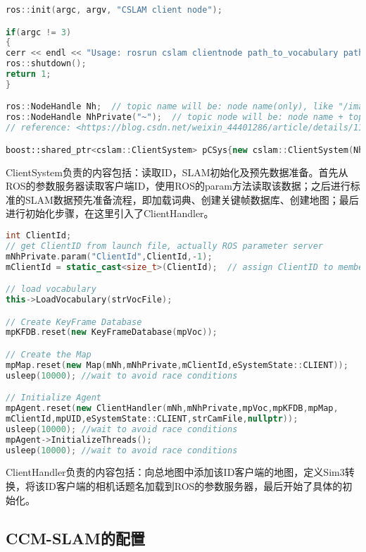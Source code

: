 \begin{lstlisting}[language={C++}]
ros::init(argc, argv, "CSLAM client node");

if(argc != 3)
{
cerr << endl << "Usage: rosrun cslam clientnode path_to_vocabulary path_to_cam_params" << endl;
ros::shutdown();
return 1;
}

ros::NodeHandle Nh;  // topic name will be: node name(only), like "/image_raw"
ros::NodeHandle NhPrivate("~");  // topic node will be: node name + topic name, like "iris_0/image_raw"
// reference: <https://blog.csdn.net/weixin_44401286/article/details/112204903>

boost::shared_ptr<cslam::ClientSystem> pCSys{new cslam::ClientSystem(Nh,NhPrivate,argv[1],argv[2])};
\end{lstlisting}

ClientSystem负责的内容包括：读取ID，SLAM初始化及预先数据准备。首先从ROS的参数服务器读取客户端ID，使用ROS的param方法读取该数据；之后进行标准的SLAM数据预先准备流程，即加载词典、创建关键帧数据库、创建地图；最后进行初始化步骤，在这里引入了ClientHandler。

\begin{lstlisting}[language={C++}]
int ClientId;
// get ClientID from launch file, actually ROS parameter server
mNhPrivate.param("ClientId",ClientId,-1);
mClientId = static_cast<size_t>(ClientId);  // assign ClientID to member of class ClientSystem, mClientID

// load vocabulary
this->LoadVocabulary(strVocFile);

// Create KeyFrame Database
mpKFDB.reset(new KeyFrameDatabase(mpVoc));

// Create the Map
mpMap.reset(new Map(mNh,mNhPrivate,mClientId,eSystemState::CLIENT));
usleep(10000); //wait to avoid race conditions

// Initialize Agent
mpAgent.reset(new ClientHandler(mNh,mNhPrivate,mpVoc,mpKFDB,mpMap,
mClientId,mpUID,eSystemState::CLIENT,strCamFile,nullptr));
usleep(10000); //wait to avoid race conditions
mpAgent->InitializeThreads();
usleep(10000); //wait to avoid race conditions
\end{lstlisting}

ClientHandler负责的内容包括：向总地图中添加该ID客户端的地图，定义Sim3转换，将该ID客户端的相机话题名加载到ROS的参数服务器，最后开始了具体的初始化。


\subsection{CCM-SLAM的配置}

